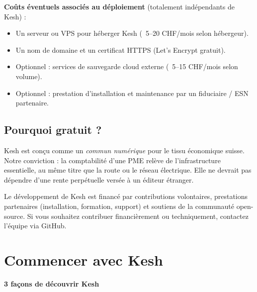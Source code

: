 \documentclass[a4paper,11pt,oneside]{article}
\begin{document}
\vspace{0.5cm}

\textbf{Coûts éventuels associés au déploiement} (totalement indépendants de Kesh) :

\begin{itemize}
    \item Un serveur ou VPS pour héberger Kesh (~5--20 CHF/mois selon hébergeur).
    \item Un nom de domaine et un certificat HTTPS (Let's Encrypt gratuit).
    \item Optionnel : services de sauvegarde cloud externe (~5--15 CHF/mois selon volume).
    \item Optionnel : prestation d'installation et maintenance par un fiduciaire / ESN partenaire.
\end{itemize}

\vspace{0.5cm}

\subsection*{\color{keshPrimary}Pourquoi gratuit ?}

Kesh est conçu comme un \emph{commun numérique} pour le tissu économique suisse. Notre conviction : la comptabilité d'une PME relève de l'infrastructure essentielle, au même titre que la route ou le réseau électrique. Elle ne devrait pas dépendre d'une rente perpétuelle versée à un éditeur étranger.

Le développement de Kesh est financé par contributions volontaires, prestations partenaires (installation, formation, support) et soutiens de la communauté open-source. Si vous souhaitez contribuer financièrement ou techniquement, contactez l'équipe via GitHub.


\clearpage

\section*{\color{keshPrimary}Commencer avec Kesh}

\vspace{1cm}

\begin{tcolorbox}[%
    enhanced,
    colback=keshPrimary, colframe=keshPrimary,
    boxrule=0pt, arc=8pt,
    halign=center,
    coltext=white,
    boxsep=20pt%
]
\sffamily

{\Huge\bfseries\color{white}3 façons de découvrir Kesh}

\end{tcolorbox}
\end{document}
